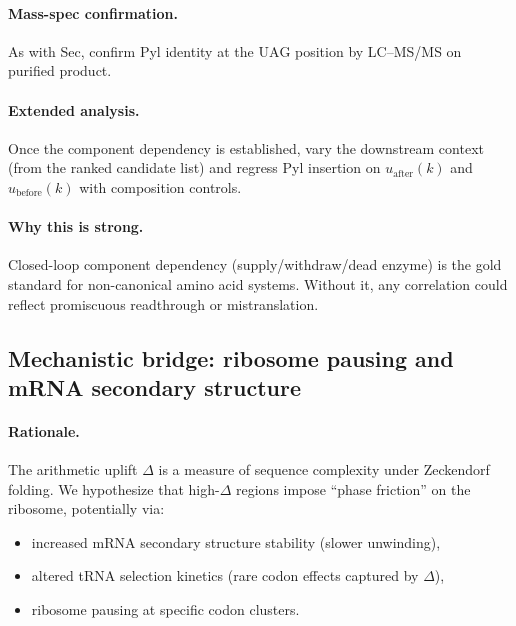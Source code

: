 \paragraph{Mass-spec confirmation.}
As with Sec, confirm Pyl identity at the $\mathrm{UAG}$ position by LC--MS/MS on purified product.

\paragraph{Extended analysis.}
Once the component dependency is established, vary the downstream context (from the ranked candidate list) and regress Pyl insertion on $u_{\mathrm{after}}(k)$ and $u_{\mathrm{before}}(k)$ with composition controls.

\paragraph{Why this is strong.}
Closed-loop component dependency (supply/withdraw/dead enzyme) is the gold standard for non-canonical amino acid systems.
Without it, any correlation could reflect promiscuous readthrough or mistranslation.

\subsection{Mechanistic bridge: ribosome pausing and mRNA secondary structure}
\label{app:bio_mech_bridge}

\paragraph{Rationale.}
The arithmetic uplift $\Delta$ is a measure of sequence complexity under Zeckendorf folding.
We hypothesize that high-$\Delta$ regions impose ``phase friction'' on the ribosome, potentially via:
\begin{itemize}
\item increased mRNA secondary structure stability (slower unwinding),
\item altered tRNA selection kinetics (rare codon effects captured by $\Delta$),
\item ribosome pausing at specific codon clusters.
\end{itemize}

